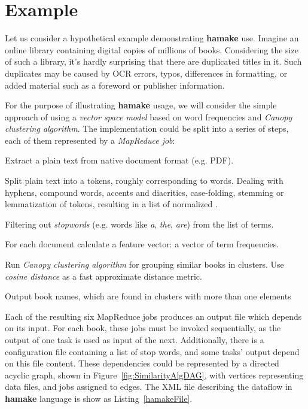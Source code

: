 \documentclass[10pt,conference,letterpaper]{IEEEtran}
\begin{document}
\section{Example}

Let us consider a hypothetical example demonstrating \textbf{hamake}
use. Imagine an online library containing digital copies of millions of
books. Considering the size of such a library, it's hardly surprising that
there are duplicated titles in it. Such duplicates may be caused by
OCR errors, typos, differences in formatting, or added material such
as a foreword or publisher information.

For the purpose of illustrating \textbf{hamake} usage, we will
consider the simple approach of using a \textit{vector space
  model}\cite{manning2008introduction} based on word frequencies and
\textit{Canopy clustering algorithm}\cite{efficientClustering}. The
implementation could be split into a series of steps, each of them
represented by a \textit{MapReduce job}:

\begin{description}
\item[\emph{ExtractText}] Extract a plain text from native document format
  (e.g. PDF).
\item[\emph{Tokenize}] Split plain text into a tokens, roughly
  corresponding to words. Dealing with hyphens, compound words,
  accents and diacritics, case-folding, stemming or lemmatization of
  tokens, resulting in a list of normalized .
\item[\emph{FilterStopwords}] Filtering out \textit{stopwords} (e.g. words
  like \textit{a}, \textit{the}, \textit{are}) from the list of
  terms.
\item[\emph{CalculateTF}] For each document calculate a feature
  vector: a vector of term frequencies.
\item[\emph{FindSimilar}] Run \textit{Canopy clustering algorithm}
  for grouping similar books in clusters. Use
  \textit{cosine distance} as a fast approximate distance metric. 
\item[\emph{OutputResult}] Output book names, which are found in
  clusters with more than one elements
\end{description}

Each of the resulting six MapReduce jobs produces an output file which
depends on its input. For each book, these jobs must be invoked
sequentially, as the output of one task is used as input of the next. Additionally, there is a configuration file containing a list of
stop words, and some tasks' output depend on this file content. These
dependencies could be represented by a directed acyclic graph, shown in
Figure~\ref{fig:SimilarityAlgDAG}, with vertices representing data
files, and jobs assigned to edges. The XML file describing the
dataflow in \textbf{hamake} language is show as
Listing~\ref{hamakeFile}.
\end{document}

